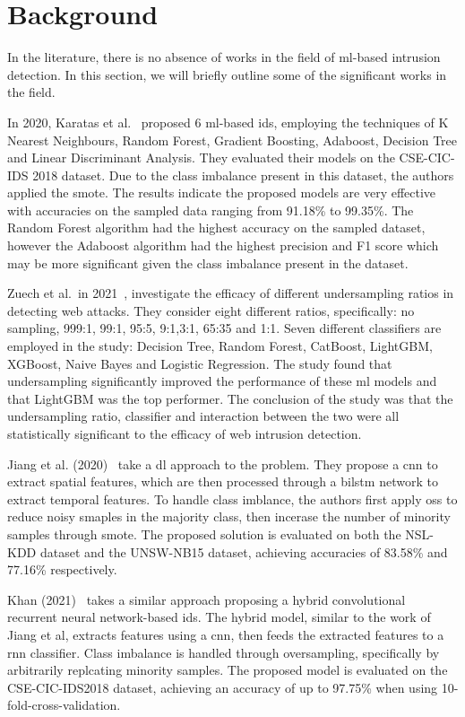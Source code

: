 \chapter{Background}%
\label{chp:background}

In the literature, there is no absence of works in the field of \gls{ml}-based
intrusion detection. In this section, we will briefly outline some of the
significant works in the field.

In 2020, Karatas et al.~\cite{Karatas} proposed 6 \gls{ml}-based \gls{ids},
employing the techniques of K Nearest Neighbours, Random Forest, Gradient
Boosting, Adaboost, Decision Tree and Linear Discriminant Analysis. They
evaluated their models on the CSE-CIC-IDS 2018 dataset. Due to the class
imbalance present in this dataset, the authors applied the \gls{smote}. The
results indicate the proposed models are very effective with accuracies on the
sampled data ranging from 91.18\% to 99.35\%. The Random Forest algorithm had
the highest accuracy on the sampled dataset, however the Adaboost algorithm had
the highest precision and F1 score which may be more significant given the
class imbalance present in the dataset.

Zuech et al.\ in 2021~\cite{Zuech}, investigate the efficacy of different
undersampling ratios in detecting web attacks. They consider eight different
ratios, specifically: no sampling, 999:1, 99:1, 95:5, 9:1,3:1, 65:35 and 1:1.
Seven different classifiers are employed in the study: Decision Tree, Random
Forest, CatBoost, LightGBM, XGBoost, Naive Bayes and Logistic Regression. The
study found that undersampling significantly improved the performance of these
\gls{ml} models and that LightGBM was the top performer. The conclusion of the
study was that the undersampling ratio, classifier and interaction between the
two were all statistically significant to the efficacy of web intrusion
detection.

Jiang et al. (2020)~\cite{Jiang} take a \gls{dl} approach to the problem. They
propose a \gls{cnn} to extract spatial features, which are then processed
through a \gls{bilstm} network to extract temporal features. To handle class
imblance, the authors first apply \gls{oss} to reduce noisy smaples in the
majority class, then incerase the number of minority samples through
\gls{smote}. The proposed solution is evaluated on both the NSL-KDD dataset and
the UNSW-NB15 dataset, achieving accuracies of 83.58\% and 77.16\%
respectively.

Khan (2021)~\cite{Khan} takes a similar approach proposing a hybrid
convolutional recurrent neural network-based \gls{ids}. The hybrid model,
similar to the work of Jiang et al, extracts features using a \gls{cnn}, then
feeds the extracted features to a \gls{rnn} classifier. Class imbalance is
handled through oversampling, specifically by arbitrarily replcating minority
samples. The proposed model is evaluated on the CSE-CIC-IDS2018 dataset,
achieving an accuracy of up to 97.75\% when using 10-fold-cross-validation.

